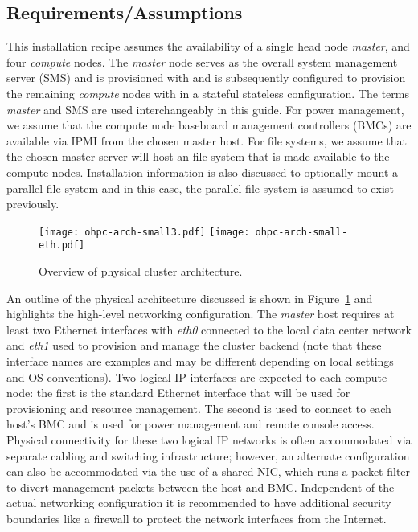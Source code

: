 \subsection{Requirements/Assumptions}
This installation recipe assumes the availability of a single head node {\em
 master}, and four {\em compute} nodes. The {\em master} node serves as the
overall system management server (SMS) and is provisioned with \baseOS{} and is
subsequently configured to provision the remaining {\em compute} nodes with
\provisioner{} in a
 stateful \else stateless \fi
configuration. The terms {\em master} and SMS are
used interchangeably in this guide. For power management, we assume that
the compute node baseboard management controllers (BMCs) are available via IPMI
from the chosen master host. For file systems, we assume that the chosen master
server will host an \NFS{} file system that is made available to the compute
nodes.
Installation information is also discussed to optionally mount a
parallel file system and in this case, the parallel file system is assumed to
exist previously.
\fi

\begin{figure}[hbt]
\center
{}
\texttt{[image: ohpc-arch-small3.pdf]}
\fi
{}
\texttt{[image: ohpc-arch-small-eth.pdf]}
\fi
\vspace*{-0.2cm}
\caption{Overview of physical cluster architecture.} \label{fig:physical_arch}
\end{figure}
\mbox{}

\vspace*{0.5cm}

An outline of the physical architecture discussed is shown in
Figure~\ref{fig:physical_arch} and highlights the high-level networking
configuration. The {\em master} host requires at least two Ethernet interfaces
with {\em eth0} connected to the local data center network and {\em eth1} used
to provision and manage the cluster backend (note that these interface names
are examples and may be different depending on local settings and OS
conventions). Two logical IP interfaces are expected to each compute node: the
first is the standard Ethernet interface that will be used for provisioning and
resource management. The second is used to connect to each host's BMC and is
used for power management and remote console access. Physical connectivity for
these two logical IP networks is often accommodated via separate cabling and
switching infrastructure; however, an alternate configuration can also be
accommodated via the use of a shared NIC, which runs a packet filter to divert
management packets between the host and BMC. Independent of the actual networking
configuration it is recommended to have additional security boundaries like a
firewall to protect the network interfaces from the Internet.

